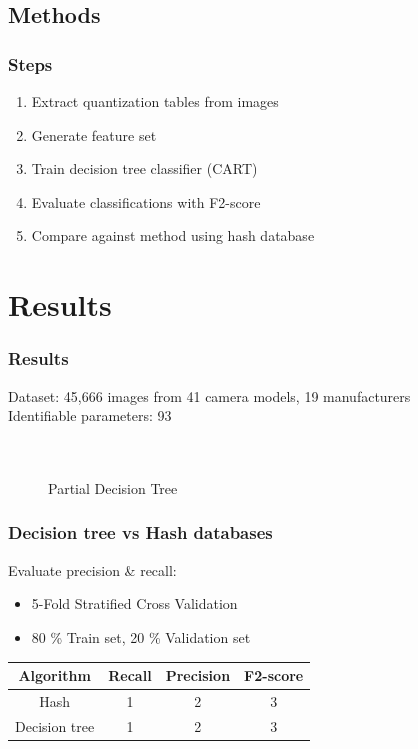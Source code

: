 \documentclass{beamer}
\begin{document}
\subsection{Methods}
\begin{frame}
\frametitle{Steps}
\begin{enumerate}
\item Extract quantization tables from images
\item Generate feature set
\item Train decision tree classifier (CART)
\item Evaluate classifications with F2-score
\item Compare against method using hash database
\end{enumerate}
\end{frame}


\section[Results]{Results}
\begin{frame}
\frametitle{Results}
Dataset: 45,666 images from 41 camera models, 19 manufacturers\\
Identifiable parameters: 93 \\
~\\~\\
\begin{figure}
   \caption{Partial Decision Tree}
\end{figure}
\end{frame}

\begin{frame}
\frametitle{Decision tree vs Hash databases}
Evaluate precision \& recall:
\begin{itemize}
\item 5-Fold Stratified Cross Validation
\item 80 \% Train set, 20 \% Validation set
\end{itemize}

\begin{table}
\begin{tabular}{| c| c| c| c|}
\hline
Algorithm & Recall & Precision & F2-score\\
\hline
Hash & 1 & 2 & 3\\
Decision tree & 1 & 2 &3 \\
\hline
\end{tabular}
\end{table}
\end{frame}
\end{document}
